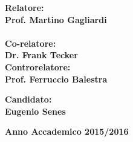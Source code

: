 \begin{titlepage}
\noindent
\begin{minipage}[t]{0.47\textwidth}
{\large{\bf Relatore:\\
Prof. Martino Gagliardi}}\\
\vspace{4mm}
\\
{\large{\bf Co-relatore:\\
Dr. Frank Tecker}}
\vspace{8mm}
{\large{\bf \\ Controrelatore:\\
Prof. Ferruccio Balestra}}
\end{minipage}
\hfill
\begin{minipage}[t]{0.47\textwidth}\raggedleft
\vspace{16mm}
{\large{\bf Candidato:\\
Eugenio Senes}}
\end{minipage}
\vspace{9mm}
\begin{center}
{\large{\bf 
Anno Accademico 2015/2016}}
\end{center}

\end{titlepage}